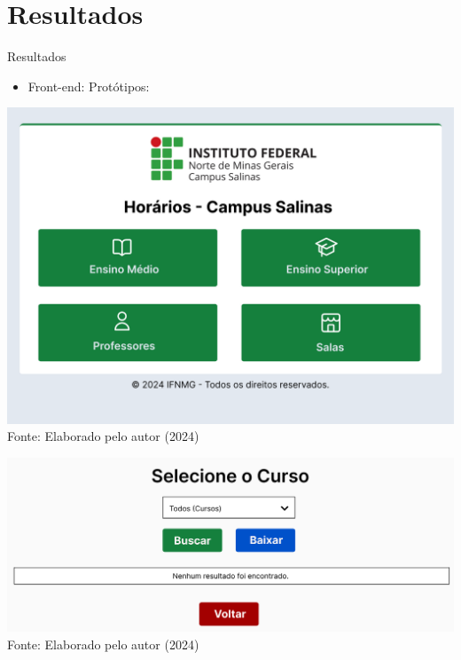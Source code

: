\section{Resultados}

\begin{frame}{Resultados}
    \begin{itemize}
        \item Front-end: Protótipos:
    \end{itemize}
    \begin{minipage}{0.48\textwidth}
        \centering
        \includegraphics[width=1\textwidth]{figuras/proto-1.png}
        \footnotesize Fonte: Elaborado pelo autor (2024)
    \end{minipage}
    \hfill
    \begin{minipage}{0.48\textwidth}
        \centering
        \includegraphics[width=1\textwidth]{figuras/proto-2.png}
        \footnotesize Fonte: Elaborado pelo autor (2024)
    \end{minipage}
\end{frame}

